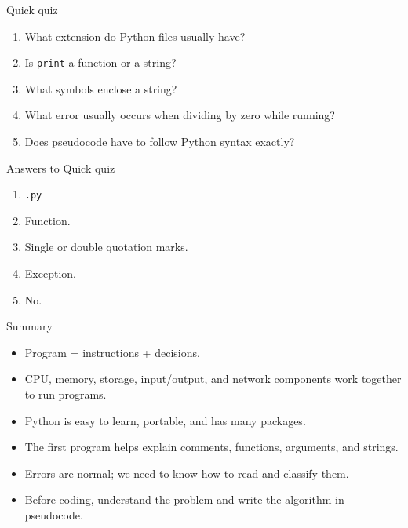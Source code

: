 \documentclass[aspectratio=169,10pt]{beamer}
\begin{document}
\begin{frame}{Quick quiz}
\begin{enumerate}
  \item What extension do Python files usually have?
  \item Is \texttt{print} a function or a string?
  \item What symbols enclose a string?
  \item What error usually occurs when dividing by zero while running?
  \item Does pseudocode have to follow Python syntax exactly?
\end{enumerate}
\end{frame}

\begin{frame}{Answers to Quick quiz}
\begin{enumerate}
  \item \texttt{.py}
  \item Function.
  \item Single or double quotation marks.
  \item Exception.
  \item No.
\end{enumerate}
\end{frame}

\begin{frame}{Summary}
\begin{itemize}
  \item Program = instructions + decisions.
  \item CPU, memory, storage, input/output, and network components work together to run programs.
  \item Python is easy to learn, portable, and has many packages.
  \item The first program helps explain comments, functions, arguments, and strings.
  \item Errors are normal; we need to know how to read and classify them.
  \item Before coding, understand the problem and write the algorithm in pseudocode.
\end{itemize}
\end{frame}
\end{document}
